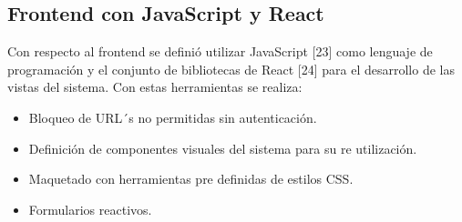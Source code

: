 \subsection{Frontend con JavaScript y React}
Con respecto al frontend se definió utilizar JavaScript [23] como lenguaje de programación y el conjunto de bibliotecas de React [24] para el desarrollo de las vistas del sistema. Con estas herramientas se realiza:
\begin{itemize}
\item Bloqueo de URL´s no permitidas sin autenticación.
\item Definición de componentes visuales del sistema para su re utilización.
\item Maquetado con herramientas pre definidas de estilos CSS.
\item Formularios reactivos.
\end{itemize}


